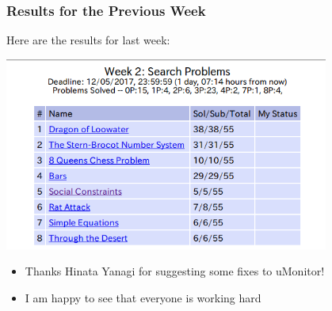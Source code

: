 \begin{frame}
  \frametitle{Results for the Previous Week}

  \begin{center}
    Here are the results for last week:

    \bigskip
    
    \includegraphics[width=0.8\textwidth]{img/resultsW2}

  \end{center}

  {\small
  \begin{itemize}
  \item Thanks Hinata Yanagi for suggesting some fixes to uMonitor!
  \item I am happy to see that everyone is working hard
  \end{itemize}}
\end{frame}


  

